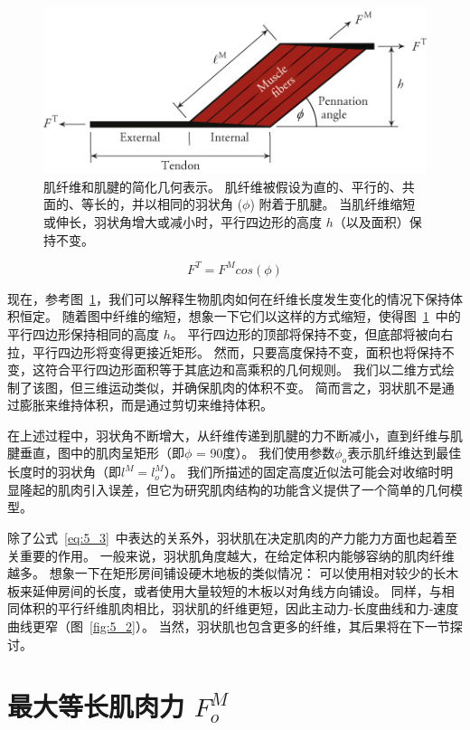 \begin{figure}[!htb]
	\centering
	\includegraphics[width=0.75\linewidth]{chap5/5_4}
	\caption{肌纤维和肌腱的简化几何表示。
		肌纤维被假设为直的、平行的、共面的、等长的，并以相同的羽状角 ($\phi$) 附着于肌腱。
			当肌纤维缩短或伸长，羽状角增大或减小时，平行四边形的高度 $h$（以及面积）保持不变\cite{zajac1989muscle}。 \label{fig:5_4}}
\end{figure}

\begin{equation}
	F^T = F^M cos(\phi) 
	\label{eq:5_3}
\end{equation}

现在，参考图~\ref{fig:5_4}，我们可以解释生物肌肉如何在纤维长度发生变化的情况下保持体积恒定。
随着图中纤维的缩短，想象一下它们以这样的方式缩短，使得图~\ref{fig:5_4}~中的平行四边形保持相同的高度 $h$。
平行四边形的顶部将保持不变，但底部将被向右拉，平行四边形将变得更接近矩形。
然而，只要高度保持不变，面积也将保持不变，这符合平行四边形面积等于其底边和高乘积的几何规则。
我们以二维方式绘制了该图，但三维运动类似，并确保肌肉的体积不变。
简而言之，羽状肌不是通过膨胀来维持体积，而是通过剪切来维持体积。


在上述过程中，羽状角不断增大，从纤维传递到肌腱的力不断减小，直到纤维与肌腱垂直，图中的肌肉呈矩形（即$\phi$ = 90度）。
我们使用参数$\phi_o$表示肌纤维达到最佳长度时的羽状角（即$l^M = l_o^M$）。
我们所描述的固定高度近似法可能会对收缩时明显隆起的肌肉引入误差，但它为研究肌肉结构的功能含义提供了一个简单的几何模型。


除了公式~\ref{eq:5_3}~中表达的关系外，羽状肌在决定肌肉的产力能力方面也起着至关重要的作用。
一般来说，羽状肌角度越大，在给定体积内能够容纳的肌肉纤维越多。
想象一下在矩形房间铺设硬木地板的类似情况：
可以使用相对较少的长木板来延伸房间的长度，或者使用大量较短的木板以对角线方向铺设。
同样，与相同体积的平行纤维肌肉相比，羽状肌的纤维更短，因此主动力-长度曲线和力-速度曲线更窄（图~\ref{fig:5_2}）。
当然，羽状肌也包含更多的纤维，其后果将在下一节探讨。



\section{最大等长肌肉力 $F_o^M$}

